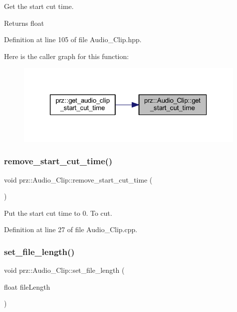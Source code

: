 Get the start cut time. 

\begin{DoxyReturn}{Returns}
float 
\end{DoxyReturn}


Definition at line 105 of file Audio\+\_\+\+Clip.\+hpp.

Here is the caller graph for this function\+:
\nopagebreak
\begin{figure}[H]
\begin{center}
\leavevmode
\includegraphics[width=316pt]{classprz_1_1_audio___clip_a0000a44ffec1e064301fd93750806aab_icgraph}
\end{center}
\end{figure}
\mbox{\label{classprz_1_1_audio___clip_a07044f0528a26e2fe0afb5d7c645f13d}} 
\subsubsection{\texorpdfstring{remove\_start\_cut\_time()}{remove\_start\_cut\_time()}}
{\footnotesize\ttfamily void prz\+::\+Audio\+\_\+\+Clip\+::remove\+\_\+start\+\_\+cut\+\_\+time (\begin{DoxyParamCaption}{ }\end{DoxyParamCaption})}



Put the start cut time to 0. To cut. 



Definition at line 27 of file Audio\+\_\+\+Clip.\+cpp.

\mbox{\label{classprz_1_1_audio___clip_ab45f2a30cf63261040e4212af3dc08d7}} 
\subsubsection{\texorpdfstring{set\_file\_length()}{set\_file\_length()}}
{\footnotesize\ttfamily void prz\+::\+Audio\+\_\+\+Clip\+::set\+\_\+file\+\_\+length (\begin{DoxyParamCaption}\item[{float}]{file\+Length }\end{DoxyParamCaption})}



